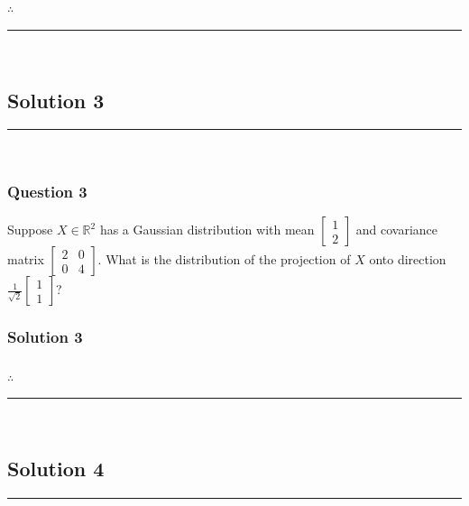 \documentclass{article}
\begin{document}
\subsubsection*{\normalfont}{$\therefore$ }

\noindent\rule{\textwidth}{0.4pt}\\

\newpage

\subsection*{Solution 3}
\noindent\rule{\textwidth}{0.4pt}\\
\subsubsection*{Question 3}
\begin{flushleft}
    Suppose $X \in \mathbb{R}^2$ has a Gaussian distribution with mean $\begin{bmatrix}1 \\ 2\end{bmatrix}$ and covariance matrix $\begin{bmatrix}2 & 0 \\ 0 & 4\end{bmatrix}$. 
    What is the distribution of the projection of $X$ onto direction $\frac{1}{\sqrt{2}}\begin{bmatrix}1 \\ 1\end{bmatrix}$? 
\end{flushleft}

\subsubsection*{Solution 3}


\subsubsection*{\normalfont}{$\therefore$ }

\noindent\rule{\textwidth}{0.4pt}\\

\newpage

\subsection*{Solution 4}
\noindent\rule{\textwidth}{0.4pt}\\
\end{document}
